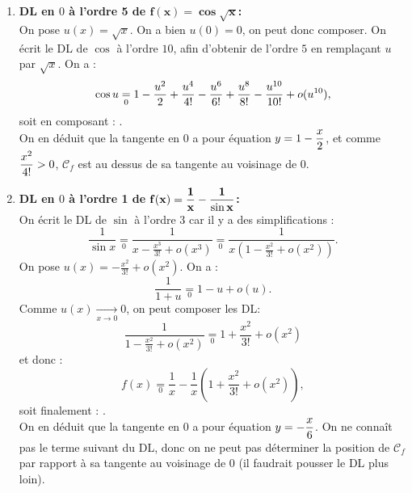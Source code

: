 \documentclass[a4paper, 11pt,reqno]{article}
\begin{document}
\begin{correction}
\begin{enumerate}
		      donc on en d\'eduit :
		      $$f(x) \underset{0}{=} 1+\frac{1}{3} (x+x^2) - \frac{1}{9} (x+x^2)^2 + o(x^2) = 1 + \frac{1}{3} x + \frac{1}{3} x^2 - \frac{1}{9} x^2 +o(x^2).$$
		      Soit finalement : .\\
		      On en d\'eduit que la tangente en $0$ a pour \'equation $y=1+\ddp\frac{x}{3}$, et comme $\ddp\frac{2}{9}x^2>0$, $\mathcal{C}_f$ est au dessus de sa tangente au voisinage de $0$.
		\item \textbf{DL en $0$  \`a l'ordre 5 de $\mathbf{f(x)=\cos{\sqrt{x}}}$:}\\
		      On pose $u(x) = \sqrt{x}$. On a bien $u(0)=0$, on peut donc composer. On \'ecrit le DL de $\cos$ \`a l'ordre $10$, afin d'obtenir de l'ordre $5$ en rempla\c cant $u$ par $\sqrt{x}$. On a :
		      $$\cos u \underset{0}{=} 1-\frac{u^2}{2}+\displaystyle\frac{u^4}{4!}-\displaystyle\frac{u^6}{6!}+\displaystyle\frac{u^8}{8!}-\displaystyle\frac{u^{10}}{10!}     + o (u^{10}),$$
		      soit en composant : .\\
		      On en d\'eduit que la tangente en $0$ a pour \'equation $y=1-\displaystyle\frac{x}{2}$, et comme $\displaystyle\frac{x^2}{4!}>0$, $\mathcal{C}_f$ est au dessus de sa tangente au voisinage de $0$.
		\item \textbf{DL en $0$ \`a l'ordre 1 de $\mathbf{f(x)=\displaystyle\frac{1}{x}-\displaystyle\frac{1}{\sin{x}}}$:}\\
		      On \'ecrit le DL de $\sin$ \`a l'ordre $3$ car il y a des simplifications :
		      $$\frac{1}{\sin x} \underset{0}{=} \frac{1}{x-\frac{x^3}{3!} + o(x^3)} \underset{0}{=}  \frac{1}{x\left(1-\frac{x^2}{3!}+o(x^2)\right)}.$$
		      On pose $u(x) = -\frac{x^2}{3!}+o(x^2)$. On a :
		      $$\frac{1}{1+u} \underset{0}{=} 1-u+o(u).$$
		      Comme $u(x) \mathop{\rightarrow}\limits_{x\to 0} 0$, on peut composer les DL:
		      $$\frac{1}{1-\frac{x^2}{3!}+o(x^2)}  \underset{0}{=}  1+\frac{x^2}{3!}+o(x^2)$$
		      et donc :
		      $$f(x) \underset{0}{=} \frac{1}{x} - \frac{1}{x} \left( 1+\frac{x^2}{3!}+o(x^2)\right),$$
		      soit finalement : .\\
		      On en d\'eduit que la tangente en $0$ a pour \'equation $y= -\displaystyle\frac{x}{6}$. On ne conna\^it pas le terme suivant du DL, donc on ne peut pas d\'eterminer la position de $\mathcal{C}_f$ par rapport \`a sa tangente au voisinage de $0$ (il faudrait pousser le DL plus loin).

\end{enumerate}
\end{correction}
\end{document}
